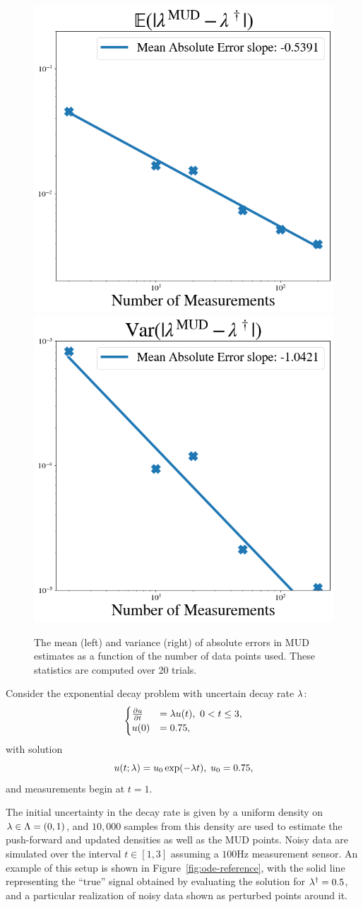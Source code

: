 \begin{figure}[htb]
  \centering
  \includegraphics[width=0.45\linewidth]{figures/ode/ode_convergence_mud_obs_mean.png}
  \includegraphics[width=0.45\linewidth]{figures/ode/ode_convergence_mud_obs_var.png}
  \caption{The mean (left) and variance (right) of absolute errors in MUD estimates as a function of the number of data points used. These statistics are computed over 20 trials.
  {
  }
  }
  \label{fig:ode-convergence-obs}
\end{figure}

Consider the exponential decay problem with uncertain decay rate $\lambda$:
$$
\begin{cases}
\frac{\partial u}{\partial t} & = \lambda u(t), \ 0<t\leq 3, \\ u(0) &= 0.75,
\end{cases}
$$
with solution
\begin{equation}
  u(t;\lambda) = u_0\exp(-\lambda t), \; u_0 = 0.75 ,
\end{equation}
and measurements begin at $t=1$.

The initial uncertainty in the decay rate is given by a uniform density on $\lambda \in \Lambda = (0, 1)$, and $10,000$ samples from this density are used to estimate the push-forward and updated densities as well as the MUD points.
Noisy data are simulated over the interval $t \in [1,3]$ assuming a $100$Hz measurement sensor.
An example of this setup is shown in Figure~\ref{fig:ode-reference}, with the solid line representing the ``true'' signal obtained by evaluating the solution for $\lambda^\dagger = 0.5$, and a particular realization of noisy data shown as perturbed points around it.

